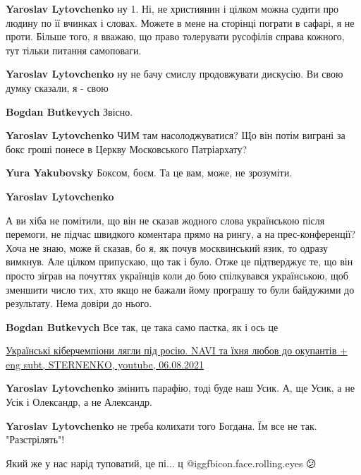 \begin{itemize}
\begin{itemize}
\textbf{Yaroslav Lytovchenko} ну 1. Ні, не християнин і цілком можна судити про людину по її вчинках і словах. Можете в мене на сторінці пограти в сафарі, я не проти. Більше того, я вважаю, що право толерувати русофілів справа кожного, тут тільки питання самоповаги.


\textbf{Yaroslav Lytovchenko} ну не бачу смислу продовжувати дискусію. Ви свою думку сказали, я - свою

\textbf{Bogdan Butkevych} Звісно.

\textbf{Yaroslav Lytovchenko} ЧИМ там насолоджуватися? Що він потім виграні за бокс гроші понесе в Церкву Московського Патріархату?

\textbf{Yura Yakubovsky} Боксом, боєм. Та це вам, може, не зрозуміти.

\textbf{Yaroslav Lytovchenko} 

А ви хіба не помітили, що він не сказав жодного слова українською після
перемоги, не підчас швидкого коментара прямо на рингу, а на прес-конференції?
Хоча не знаю, може й сказав, бо я, як почув москвинський язик, то одразу
вимкнув. Але цілком припускаю, що так і було. Отже це підтверджує те, що він
просто зіграв на почуттях українців коли до бою спілкувався українською, щоб
зменшити число тих, хто якщо не бажали йому програшу то були байдужими до
результату. Нема довіри до нього.

\textbf{Bogdan Butkevych} Все так, це така само пастка, як і ось це

\href{https://www.youtube.com/watch?v=Bl_lvyaOhRc&t=12s}{%
Українські кіберчемпіони лягли під росію. NAVI та їхня любов до окупантів + eng subt, STERNENKO, %
youtube, 06.08.2021%
}

\textbf{Yaroslav Lytovchenko} змінить парафію, тоді буде наш Усик. А, ще Усик, а не Усік і Олександр, а не Александр.

\textbf{Yaroslav Lytovchenko} не треба колихати того Богдана. Їм все не так. "Разстрілять"!

\end{itemize} %

Який же у нас нарід туповатий, це пі... ц @igg{fbicon.face.rolling.eyes} 😕



\end{itemize} %
